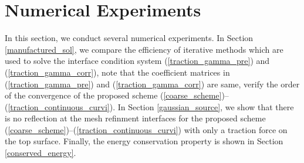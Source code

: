 \section{Numerical Experiments}
In this section, we conduct several numerical experiments. In Section \ref{manufactured_sol}, we compare the efficiency of iterative methods which are used to solve the interface condition system (\ref{traction_gamma_pre}) and (\ref{traction_gamma_corr}), note that the coefficient matrices in (\ref{traction_gamma_pre}) and (\ref{traction_gamma_corr}) are same, verify the order of the convergence of the proposed scheme (\ref{coarse_scheme})--(\ref{traction_continuous_curvi}). In Section \ref{gaussian_source}, we show that there is no reflection at the mesh refinment interfaces for the proposed scheme (\ref{coarse_scheme})--(\ref{traction_continuous_curvi}) with only a traction force on the top surface. Finally, the energy conservation property is shown in Section \ref{conserved_energy}.